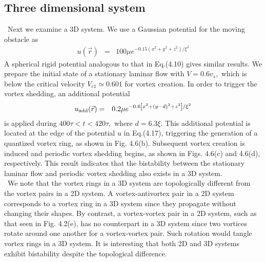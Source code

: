 \documentclass[12pt,a4paper]{report}
\begin{document}
\subsection{Three dimensional system}
\ Next we examine a 3D system. We use a Gaussian
potential for the moving obstacle as
\begin{eqnarray}
u ( \vec{r} ) & = & 100 \mu e^{-0.15 \left(x^2+y^2+z^2 \right) / \xi^2}
\end{eqnarray}
A spherical rigid potential analogous to that in Eq.(4.10)
gives similar results. We prepare the initial state of a stationary
laminar flow with $V=0.6v_s,$ which is below the
critical velocity $V_{c1} \simeq 0.601$ for vortex creation. In order
to trigger the vortex shedding, an additional potential
\begin{eqnarray}
u_{{\rm add}} (\vec{r}) & = & 0.2\mu e^{-0.6 \left[x^2+(y-d)^2+z^2 \right] / \xi^2}
\end{eqnarray}
is applied during $400 \tau < t < 420 \tau,$ where $d=6.3 \xi$. This
additional potential is located at the edge of the potential
$u$ in Eq.(4.17), triggering the generation of a quantized
vortex ring, as shown in Fig. 4.6(b). Subsequent vortex
creation is induced and periodic vortex shedding begins,
as shown in Figs. 4.6(c) and 4.6(d), respectively. This
result indicates that the bistability between the stationary
laminar flow and periodic vortex shedding also exists in
a 3D system.
\\
\ We note that the vortex rings in a 3D system are topologically
different from the vortex pairs in a 2D system. A
vortex-antivortex pair in a 2D system corresponds to a vortex
ring in a 3D system since they propagate without changing
their shapes. By contrast, a vortex-vortex pair in a 2D system,
such as that seen in Fig. 4.2(e), has no counterpart in a 3D system
since two vortices rotate around one another for a vortex-vortex
pair. Such rotation would tangle vortex rings in a 3D system.
It is interesting that both 2D and 3D systems exhibit bistability
despite the topological difference.
\end{document}
